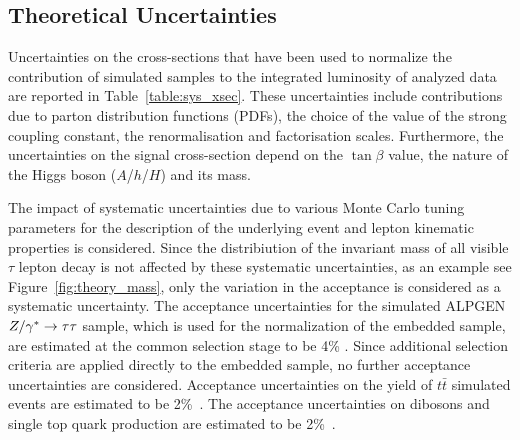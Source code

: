 \subsection{Theoretical Uncertainties}
\label{sec:sys_theory}

Uncertainties on the cross-sections that have been used to normalize
the contribution of simulated samples to the integrated luminosity of analyzed data are reported in
Table~\ref{table:sys_xsec}. These
uncertainties include contributions due to parton distribution
functions (PDFs), the choice of the value of the strong coupling constant,
the renormalisation and factorisation scales.  Furthermore, the
uncertainties on the signal cross-section depend on the  $\tan\beta$ value, the nature of the 
Higgs boson ($A$/$h$/$H$) and its mass.

The impact  of systematic uncertainties due to various Monte Carlo tuning
parameters for the description of the  underlying event and
lepton kinematic properties is considered.
Since the distribiution of the invariant mass of all visible $\tau$ lepton decay is not affected by these systematic
uncertainties, as an example see
Figure~\ref{fig:theory_mass}, 
only the variation in the acceptance is considered as a systematic uncertainty.
The acceptance uncertainties for the simulated ALPGEN $Z/\gamma^*\rightarrow \tau\tau$  sample, which is 
used for the normalization of the embedded sample, 
are estimated at the common selection stage to be 4\% \cite{2010SMLLSupportNote}.
Since additional selection criteria  are applied directly to the embedded sample, 
no further acceptance uncertainties are considered. Acceptance uncertainties on the yield of 
$t\bar{t}$ simulated events are estimated to be  2\%~\cite{ttbaremu}. %
The acceptance uncertainties on dibosons and single top quark production are estimated to be 2\%~\cite{2010SMLLSupportNote}.

